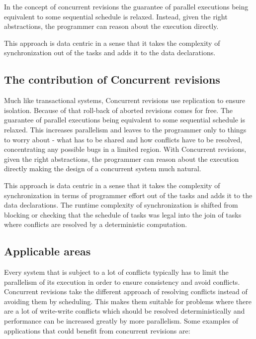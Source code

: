 \documentclass[12pt,twoside,notitlepage]{report}
\begin{document}
In the concept of concurrent revisions the guarantee of parallel executions being equivalent to some sequential schedule is relaxed. Instead, given the right abstractions, the programmer can reason about the execution directly. 

This approach is data centric in a sense that it takes the complexity of synchronization out of the tasks and adds it to the data declarations.  

\subsection{The contribution of Concurrent revisions}

Much like transactional systems, Concurrent revisions use replication to ensure isolation. Because of that roll-back of aborted revisions comes for free. The guarantee of parallel executions being equivalent to some sequential schedule is relaxed. This increases parallelism and leaves to the programmer only to things to worry about - what has to be shared and how conflicts have to be resolved, concentrating any possible bugs in a limited region. With Concurrent revisions, given the right abstractions, the programmer can reason about the execution directly making the design of a concurrent system much natural.

This approach is data centric in a sense that it takes the complexity of synchronization in terms of programmer effort out of the tasks and adds it to the data declarations. The runtime complexity of synchronization is shifted from blocking or checking that the schedule of tasks was legal into the join of tasks where conflicts are resolved by a deterministic computation.   

\subsection{Applicable areas}
Every system that is subject to a lot of conflicts typically has to limit the parallelism of its execution in order to ensure consistency and avoid conflicts. Concurrent revisions take the different approach of resolving conflicts instead of avoiding them by scheduling. This makes them suitable for problems where there are a lot of write-write conflicts which should be resolved deterministically and performance can be increased greatly by more parallelism. Some examples of applications that could benefit from concurrent revisions are: 
\end{document}
